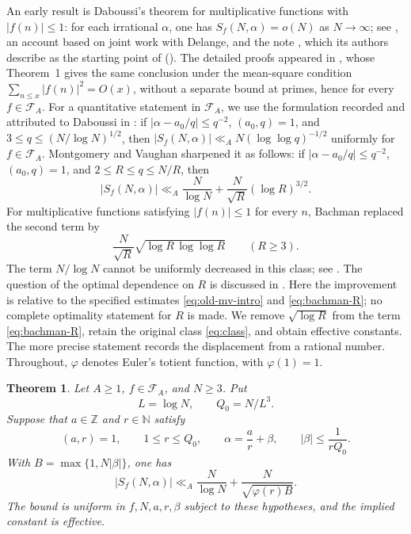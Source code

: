 \documentclass[11pt]{amsart}
\numberwithin{equation}{section}
\numberwithin{figure}{section}
\newtheorem{theorem}{Theorem}[section]
\theoremstyle{definition}
\newcommand{\Z}{\mathbb{Z}}
\newcommand{\N}{\mathbb{N}}
\newcommand{\FA}{\mathcal F_A}
\begin{document}
An early result is Daboussi's theorem for multiplicative functions
with $|f(n)|\le1$: for each irrational $\alpha$, one has
$S_f(N,\alpha)=o(N)$ as $N\to\infty$; see
\cite[Theorem~1, p.~322]{D}, an account based on joint work with
Delange, and the note \cite{DD}, which its authors describe as the
starting point of \cite{MV} (\cite[p.~246]{DD2}). The detailed proofs
appeared in \cite{DD2}, whose Theorem~1 gives the same conclusion under
the mean-square condition $\sum_{n\le x}|f(n)|^2=O(x)$, without a
separate bound at primes, hence for every $f\in\FA$.
For a quantitative statement in $\FA$, we use the
formulation recorded and attributed to Daboussi in
\cite[equation~(3), p.~69]{MV}: if $|\alpha-a_0/q|\le q^{-2}$,
$(a_0,q)=1$, and $3\le q\le(N/\log N)^{1/2}$, then
$|S_f(N,\alpha)|\ll_A N(\log\log q)^{-1/2}$ uniformly for $f\in\FA$.
Montgomery and Vaughan
\cite[Corollary~1]{MV} sharpened it as follows: if
$|\alpha-a_0/q|\le q^{-2}$, $(a_0,q)=1$, and $2\le R\le q\le N/R$,
then
\begin{equation}\label{eq:old-mv-intro}
 |S_f(N,\alpha)|
 \ll_A \frac{N}{\log N}
       +\frac{N}{\sqrt R}(\log R)^{3/2}.
\end{equation}
For multiplicative functions satisfying $|f(n)|\le1$ for every $n$,
Bachman \cite[Theorem~5]{Bachman} replaced the second term by
\begin{equation}\label{eq:bachman-R}
 \frac{N}{\sqrt R}\sqrt{\log R\,\log\log R}\qquad(R\ge3).
\end{equation}
The term $N/\log N$ cannot be uniformly decreased in this class;
see \cite[Section~7]{MV}. The question of the optimal dependence on
$R$ is discussed in \cite[Section~1]{BBK}. Here the improvement is
relative to the specified estimates \eqref{eq:old-mv-intro} and
\eqref{eq:bachman-R}; no complete optimality statement for $R$ is made.
We remove $\sqrt{\log R}$ from the term \eqref{eq:bachman-R}, retain
the original class \eqref{eq:class}, and obtain effective constants.
The more precise statement records the displacement from a rational
number. Throughout, $\varphi$ denotes Euler's totient function, with
$\varphi(1)=1$.

\begin{theorem}\label{thm:main}
Let $A\ge1$, $f\in\FA$, and $N\ge3$. Put
\begin{equation}\label{eq:Q0}
 L=\log N,\qquad Q_0=N/L^3.
\end{equation}
Suppose that $a\in\Z$ and $r\in\N$ satisfy
\begin{equation}\label{eq:main-approx}
 (a,r)=1,\qquad 1\le r\le Q_0,\qquad
 \alpha=\frac ar+\beta,\qquad |\beta|\le\frac1{rQ_0}.
\end{equation}
With $B=\max\{1,N|\beta|\}$, one has
\begin{equation}\label{eq:main-bound}
 |S_f(N,\alpha)|
 \ll_A \frac{N}{\log N}
       +\frac{N}{\sqrt{\varphi(r)B}}.
\end{equation}
The bound is uniform in $f,N,a,r,\beta$ subject to these hypotheses,
and the implied constant is effective.
\end{theorem}
\end{document}
